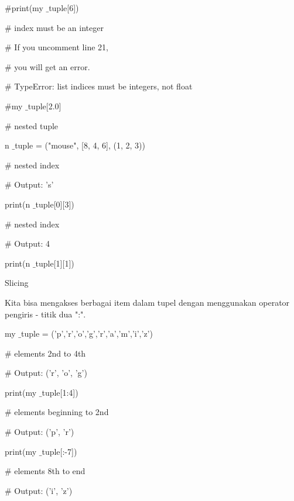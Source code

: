 \vspace{12pt}
 $  \#  $print(my $  \_  $tuple[6]) \par
\vspace{12pt}
 $  \#  $ index must be an integer \par
 $  \#  $ If you uncomment line 21, \par
 $  \#  $ you will get an error. \par
 $  \#  $ TypeError: list indices must be integers, not float \par
\vspace{12pt}
 $  \#  $my $  \_  $tuple[2.0] \par
\vspace{12pt}
 $  \#  $ nested tuple \par
n $  \_  $tuple = ("mouse", [8, 4, 6], (1, 2, 3)) \par
\vspace{12pt}
 $  \#  $ nested index \par
 $  \#  $ Output: 's' \par
print(n $  \_  $tuple[0][3]) \par
\vspace{12pt}
 $  \#  $ nested index \par
 $  \#  $ Output: 4 \par
print(n $  \_  $tuple[1][1]) \par
\vspace{12pt}
Slicing \par
\vspace{12pt}
Kita bisa mengakses berbagai item dalam tupel dengan menggunakan operator pengiris - titik dua ":". \par
\vspace{12pt}
my $  \_  $tuple = ('p','r','o','g','r','a','m','i','z') \par
\vspace{12pt}
 $  \#  $ elements 2nd to 4th \par
 $  \#  $ Output: ('r', 'o', 'g') \par
print(my $  \_  $tuple[1:4]) \par
\vspace{12pt}
 $  \#  $ elements beginning to 2nd \par
 $  \#  $ Output: ('p', 'r') \par
print(my $  \_  $tuple[:-7]) \par
\vspace{12pt}
 $  \#  $ elements 8th to end \par
 $  \#  $ Output: ('i', 'z') \par
